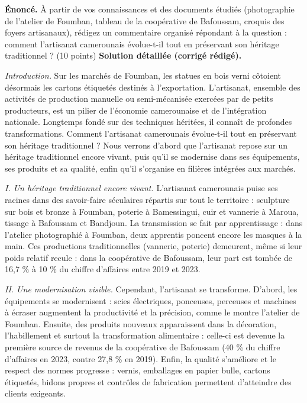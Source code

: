 \documentclass[11pt]{article}
\newcommand{\cle}[1]{{\popxbold\color{popdark}#1}}
\begin{document}
\begin{exoresolu}
\textbf{Énoncé.} À partir de vos connaissances et des documents étudiés (photographie de l'atelier de Foumban, tableau de la coopérative de Bafoussam, croquis des foyers artisanaux), rédigez un commentaire organisé répondant à la question : comment l'artisanat camerounais évolue-t-il tout en préservant son héritage traditionnel ? (10 points)
\tcblower
\textbf{Solution détaillée (corrigé rédigé).}

\emph{Introduction.} Sur les marchés de Foumban, les statues en bois verni côtoient désormais les cartons étiquetés destinés à l'exportation. L'\cle{artisanat}, ensemble des activités de production manuelle ou semi-mécanisée exercées par de petits producteurs, est un pilier de l'économie camerounaise et de l'intégration nationale. Longtemps fondé sur des techniques héritées, il connaît de profondes transformations. Comment l'artisanat camerounais évolue-t-il tout en préservant son héritage traditionnel ? Nous verrons d'abord que l'artisanat repose sur un héritage traditionnel encore vivant, puis qu'il se modernise dans ses équipements, ses produits et sa qualité, enfin qu'il s'organise en filières intégrées aux marchés.

\emph{I. Un héritage traditionnel encore vivant.} L'artisanat camerounais puise ses racines dans des savoir-faire séculaires répartis sur tout le territoire : sculpture sur bois et bronze à Foumban, poterie à Bamessingui, cuir et vannerie à Maroua, tissage à Bafoussam et Bandjoun. La transmission se fait par apprentissage : dans l'atelier photographié à Foumban, deux apprentis poncent encore les masques à la main. Ces productions traditionnelles (vannerie, poterie) demeurent, même si leur poids relatif recule : dans la coopérative de Bafoussam, leur part est tombée de 16,7 \% à 10 \% du chiffre d'affaires entre 2019 et 2023.

\emph{II. Une modernisation visible.} Cependant, l'artisanat se transforme. D'abord, les \cle{équipements se modernisent} : scies électriques, ponceuses, perceuses et machines à écraser augmentent la productivité et la précision, comme le montre l'atelier de Foumban. Ensuite, des \cle{produits nouveaux} apparaissent dans la décoration, l'habillement et surtout la transformation alimentaire : celle-ci est devenue la première source de revenus de la coopérative de Bafoussam (40 \% du chiffre d'affaires en 2023, contre 27,8 \% en 2019). Enfin, la \cle{qualité} s'améliore et le respect des \cle{normes} progresse : vernis, emballages en papier bulle, cartons étiquetés, bidons propres et contrôles de fabrication permettent d'atteindre des clients exigeants.


\end{exoresolu}
\end{document}
